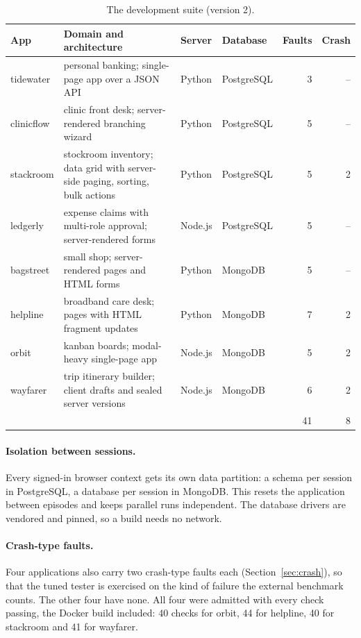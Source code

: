 \begin{table}[H]
\centering
\small
\caption{The development suite (version 2).}
\label{tab:devsuite}
\begin{tabularx}{\textwidth}{@{}l X l l r r@{}}
\toprule
App & Domain and architecture & Server & Database & Faults & Crash \\
\midrule
tidewater & personal banking; single-page app over a JSON API & Python & PostgreSQL & 3 & -- \\
clinicflow & clinic front desk; server-rendered branching wizard & Python & PostgreSQL & 5 & -- \\
stackroom & stockroom inventory; data grid with server-side paging, sorting, bulk actions & Python & PostgreSQL & 5 & 2 \\
ledgerly & expense claims with multi-role approval; server-rendered forms & Node.js & PostgreSQL & 5 & -- \\
bagstreet & small shop; server-rendered pages and HTML forms & Python & MongoDB & 5 & -- \\
helpline & broadband care desk; pages with HTML fragment updates & Python & MongoDB & 7 & 2 \\
orbit & kanban boards; modal-heavy single-page app & Node.js & MongoDB & 5 & 2 \\
wayfarer & trip itinerary builder; client drafts and sealed server versions & Node.js & MongoDB & 6 & 2 \\
\midrule
& & & & 41 & 8 \\
\bottomrule
\end{tabularx}
\end{table}

\paragraph{Isolation between sessions.} Every signed-in browser context gets its own data
partition: a schema per session in PostgreSQL, a database per session in MongoDB. This
resets the application between episodes and keeps parallel runs independent. The database
drivers are vendored and pinned, so a build needs no network.

\paragraph{Crash-type faults.} Four applications also carry two crash-type faults each
(Section~\ref{sec:crash}), so that the tuned tester is exercised on the kind of failure the
external benchmark counts. The other four have none. All four were admitted with every
check passing, the Docker build included: 40 checks for orbit, 44 for helpline, 40 for
stackroom and 41 for wayfarer.

